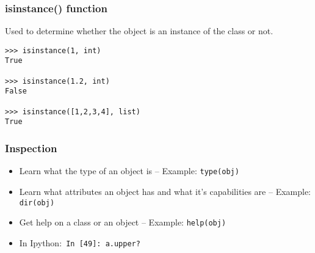 \begin{frame}[fragile]\frametitle{isinstance() function}

Used to determine whether the object is an instance of the class or not.
\begin{lstlisting}
>>> isinstance(1, int)
True
 
>>> isinstance(1.2, int)
False
 
>>> isinstance([1,2,3,4], list)
True
\end{lstlisting}

\end{frame}


\begin{frame}[fragile] \frametitle{Inspection}
\begin{itemize}
\item  Learn what the type of an object is -- Example:  \lstinline|type(obj)|
\item Learn what attributes an object has and what it's capabilities are -- Example: \lstinline|dir(obj)|
\item Get help on a class or an object -- Example:  \lstinline|help(obj)|
\item In Ipython:\lstinline| In [49]: a.upper?|
\end{itemize}
\end{frame}


